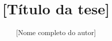 \documentclass[msc,en,
twoside,11pt,utf8,a4paper,
]{thesisdifctunl}
\title{[Título da tese]}
\author[f]{[Nome completo do autor]}
\begin{document}
\frontmatter

\frontpage

\printcopyright

\printdedicatory

\printacknowledgements

\printquote

\printabstract

\tableofcontents 

\printotherlists 

\printchapthers

\printbib

\printappendixes 

\end{document}
